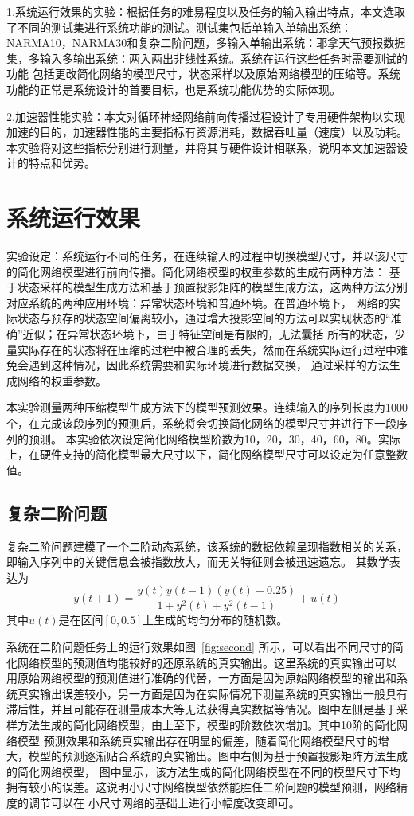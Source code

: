 1.系统运行效果的实验：根据任务的难易程度以及任务的输入输出特点，本文选取了不同的测试集进行系统功能的测试。测试集包括单输入单输出系统：
NARMA10，NARMA30和复杂二阶问题，多输入单输出系统：耶拿天气预报数据集，多输入多输出系统：两入两出非线性系统。系统在运行这些任务时需要测试的功能
包括更改简化网络的模型尺寸，状态采样以及原始网络模型的压缩等。系统功能的正常是系统设计的首要目标，也是系统功能优势的实际体现。

2.加速器性能实验：本文对循环神经网络前向传播过程设计了专用硬件架构以实现加速的目的，加速器性能的主要指标有资源消耗，数据吞吐量（速度）以及功耗。
本实验将对这些指标分别进行测量，并将其与硬件设计相联系，说明本文加速器设计的特点和优势。

\section{系统运行效果}
实验设定：系统运行不同的任务，在连续输入的过程中切换模型尺寸，并以该尺寸的简化网络模型进行前向传播。简化网络模型的权重参数的生成有两种方法：
基于状态采样的模型生成方法和基于预置投影矩阵的模型生成方法，这两种方法分别对应系统的两种应用环境：异常状态环境和普通环境。在普通环境下，
网络的实际状态与预存的状态空间偏离较小，通过增大投影空间的方法可以实现状态的“准确”近似；在异常状态环境下，由于特征空间是有限的，无法囊括
所有的状态，少量实际存在的状态将在压缩的过程中被合理的丢失，然而在系统实际运行过程中难免会遇到这种情况，因此系统需要和实际环境进行数据交换，
通过采样的方法生成网络的权重参数。

本实验测量两种压缩模型生成方法下的模型预测效果。连续输入的序列长度为1000个，在完成该段序列的预测后，系统将会切换简化网络的模型尺寸并进行下一段序列的预测。
本实验依次设定简化网络模型阶数为10，20，30，40，60，80。实际上，在硬件支持的简化模型最大尺寸以下，简化网络模型尺寸可以设定为任意整数值。

\subsection{复杂二阶问题}
复杂二阶问题建模了一个二阶动态系统，该系统的数据依赖呈现指数相关的关系，即输入序列中的关键信息会被指数放大，而无关特征则会被迅速遗忘。
其数学表达为
\begin{equation}
	y(t+1) = \frac{y(t)y(t-1)(y(t)+0.25)}{1+y^2(t)+y^2(t-1)} + u(t)
\end{equation}
其中\(u(t)\)是在区间\([0,0.5]\)上生成的均匀分布的随机数。


系统在二阶问题任务上的运行效果如图~\ref{fig:second} 所示，可以看出不同尺寸的简化网络模型的预测值均能较好的还原系统的真实输出。这里系统的真实输出可以
用原始网络模型的预测值进行准确的代替，一方面是因为原始网络模型的输出和系统真实输出误差较小，另一方面是因为在实际情况下测量系统的真实输出一般具有
滞后性，并且可能存在测量成本大等无法获得真实数据等情况。图中左侧是基于采样方法生成的简化网络模型，由上至下，模型的阶数依次增加。其中10阶的简化网络模型
预测效果和系统真实输出存在明显的偏差，随着简化网络模型尺寸的增大，模型的预测逐渐贴合系统的真实输出。图中右侧为基于预置投影矩阵方法生成的简化网络模型，
图中显示，该方法生成的简化网络模型在不同的模型尺寸下均拥有较小的误差。这说明小尺寸网络模型依然能胜任二阶问题的模型预测，网络精度的调节可以在
小尺寸网络的基础上进行小幅度改变即可。

